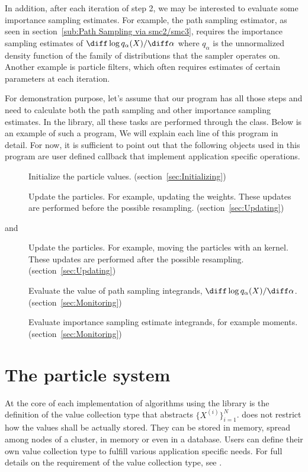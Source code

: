 In addition, after each iteration of step 2, we may be interested to evaluate
some importance sampling estimates. For example, the path sampling estimator,
as seen in section~\ref{sub:Path Sampling via smc2/smc3}, requires the
importance sampling estimates of $\diff\log q_{\alpha}(X)/\diff\alpha$ where
$q_{\alpha}$ is the unnormalized density function of the family of
distributions that the \smc sampler operates on. Another example is particle
filters, which often requires estimates of certain parameters at each
iteration.

For demonstration purpose, let's assume that our program has all those steps
and need to calculate both the path sampling and other importance sampling
estimates. In the \vsmc library, all these tasks are performed through the
 class. Below is an example of such a program,
We will explain each line of this program in detail. For now, it is sufficient
to point out that the following objects used in this program are user defined
callback that implement application specific operations.
\begin{description}
  \item[] Initialize the particle values.
    (section~\ref{sec:Initializing})
  \item[] Update the particles. For example, updating the
    weights. These updates are performed before the possible resampling.
    (section~\ref{sec:Updating})
  \item[ and ] Update the particles. For
    example, moving the particles with an \mcmc kernel. These updates are
    performed after the possible resampling. (section~\ref{sec:Updating})
  \item[] Evaluate the value of path sampling integrands,
    $\diff\log q_{\alpha}(X)/\diff\alpha$. (section~\ref{sec:Monitoring})
  \item[] Evaluate importance sampling estimate
    integrands, for example moments. (section~\ref{sec:Monitoring})
\end{description}

\section{The particle system}
\label{sec:The particle system}

At the core of each implementation of \smc algorithms using the \vsmc library
is the definition of the value collection type that abstracts
$\{X^{(i)}\}_{i=1}^N$. \vsmc does not restrict how the values shall be
actually stored. They can be stored in memory, spread among nodes of a
cluster, in \gpu memory or even in a database. Users can define their own
value collection type to fulfill various application specific needs. For full
details on the requirement of the value collection type, see \cite{vsmcjss}.

